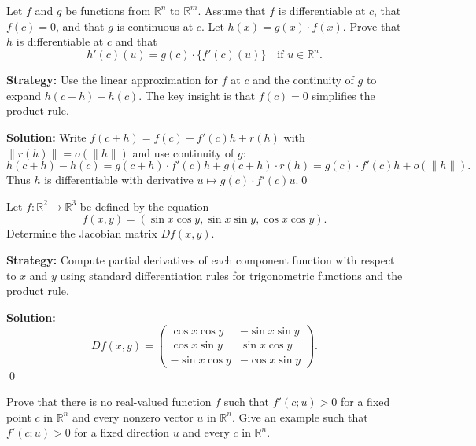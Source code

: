 \begin{problembox}
\begin{problemstatement}
Let \( f \) and \( g \) be functions from \( \mathbb{R}^n \) to \( \mathbb{R}^m \). Assume that \( f \) is differentiable at \( c \), that \( f(c) = 0 \), and that \( g \) is continuous at \( c \). Let \( h(x) = g(x) \cdot f(x) \). Prove that \( h \) is differentiable at \( c \) and that
\[h'(c)(u) = g(c) \cdot \{f'(c)(u)\} \quad \text{if } u \in \mathbb{R}^n.\]
\end{problemstatement}
\end{problembox}

\noindent\textbf{Strategy:} Use the linear approximation for \( f \) at \( c \) and the continuity of \( g \) to expand \( h(c+h) - h(c) \). The key insight is that \( f(c) = 0 \) simplifies the product rule.

\bigskip\noindent\textbf{Solution:}
Write $f(c+h)=f(c)+f'(c)h+r(h)$ with $\|r(h)\|=o(\|h\|)$ and use continuity of $g$:
\[h(c+h)-h(c)=g(c+h)\cdot f'(c)h+g(c+h)\cdot r(h)=g(c)\cdot f'(c)h+o(\|h\|).\]
Thus $h$ is differentiable with derivative $u\mapsto g(c)\cdot f'(c)u$.\qed


\begin{problembox}
\begin{problemstatement}
Let \( f : \mathbb{R}^2 \to \mathbb{R}^3 \) be defined by the equation
\[f(x, y) = (\sin x \cos y, \sin x \sin y, \cos x \cos y).\]
Determine the Jacobian matrix \( Df(x, y) \).
\end{problemstatement}
\end{problembox}

\noindent\textbf{Strategy:} Compute partial derivatives of each component function with respect to \( x \) and \( y \) using standard differentiation rules for trigonometric functions and the product rule.

\bigskip\noindent\textbf{Solution:}
\[Df(x,y)=\begin{pmatrix}
\cos x\cos y & -\sin x\sin y\\
\cos x\sin y & \sin x\cos y\\
-\sin x\cos y & -\cos x\sin y
\end{pmatrix}.\]\qed


\begin{problembox}
\begin{problemstatement}
Prove that there is no real-valued function \( f \) such that \( f'(c; u) > 0 \) for a fixed point \( c \) in \( \mathbb{R}^n \) and every nonzero vector \( u \) in \( \mathbb{R}^n \). Give an example such that \( f'(c; u) > 0 \) for a fixed direction \( u \) and every \( c \) in \( \mathbb{R}^n \).
\end{problemstatement}
\end{problembox}

